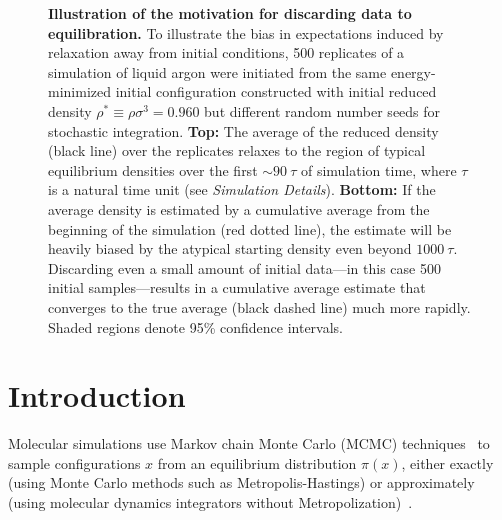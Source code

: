 \documentclass[aps,pre,twocolumn,nofootinbib,superscriptaddress,linenumbers,11point]{revtex4-1}
\begin{document}
\begin{figure}[tbp]
\caption{\label{figure:burn-in-example} {\bf Illustration of the motivation for discarding data to equilibration.} 
To illustrate the bias in expectations induced by relaxation away from initial conditions, 500 replicates of a simulation of liquid argon were initiated from the same energy-minimized initial configuration constructed with initial reduced density $\rho^* \equiv \rho \sigma^3 = 0.960$ but different random number seeds for stochastic integration.
%
{\bf Top:} The average of the reduced density (black line) over the replicates relaxes to the region of typical equilibrium densities over the first $\sim 90~\tau$ of simulation time, where $\tau$ is a natural time unit (see \emph{Simulation Details}).
%
{\bf Bottom:} If the average density is estimated by a cumulative average from the beginning of the simulation (red dotted line), the estimate will be heavily biased by the atypical starting density even beyond $1000~\tau$.
Discarding even a small amount of initial data---in this case 500 initial samples---results in a cumulative average estimate that converges to the true average (black dashed line) much more rapidly.
% 
Shaded regions denote 95\% confidence intervals.
}
\end{figure}


\section*{Introduction}
\label{section:introduction}

Molecular simulations use Markov chain Monte Carlo (MCMC) techniques~\cite{jun-s-liu:mcmc} to sample configurations $x$ from an equilibrium distribution $\pi(x)$, either exactly (using Monte Carlo methods such as Metropolis-Hastings) or approximately (using molecular dynamics integrators without Metropolization)~\cite{sivak:2013:prx:vvvr}.
\end{document}
